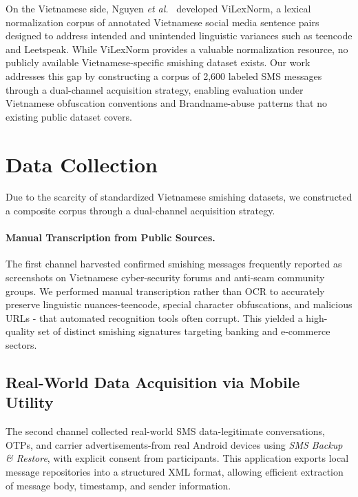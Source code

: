 \documentclass[conference]{IEEEtran}
\begin{document}
On the Vietnamese side, Nguyen \textit{et al.}~\cite{nhi2024vilexnorm}
developed ViLexNorm, a lexical normalization corpus of annotated Vietnamese
social media sentence pairs designed to address intended and unintended
linguistic variances such as teencode and Leetspeak. While ViLexNorm provides
a valuable normalization resource, no publicly available Vietnamese-specific
smishing dataset exists. Our work addresses this gap by constructing a corpus
of 2,600 labeled SMS messages through a dual-channel acquisition strategy,
enabling evaluation under Vietnamese obfuscation conventions and
Brandname-abuse patterns that no existing public dataset covers.

\section{Data Collection}
\label{sec:data}

Due to the scarcity of standardized Vietnamese smishing datasets, we
constructed a composite corpus through a dual-channel acquisition strategy.

\paragraph{Manual Transcription from Public Sources.}

The first channel harvested confirmed smishing messages frequently reported
as screenshots on Vietnamese cyber-security forums and anti-scam community
groups. We performed manual transcription rather than OCR to accurately
preserve linguistic nuances-teencode, special character obfuscations, and
malicious URLs - that automated recognition tools often corrupt. This yielded
a high-quality set of distinct smishing signatures targeting banking and
e-commerce sectors.

\subsection{Real-World Data Acquisition via Mobile Utility}

The second channel collected real-world SMS data-legitimate conversations,
OTPs, and carrier advertisements-from real Android devices using
\textit{SMS Backup \& Restore}, with explicit consent from participants.
This application exports local message repositories into a structured XML
format, allowing efficient extraction of message body, timestamp, and
sender information.
\end{document}
